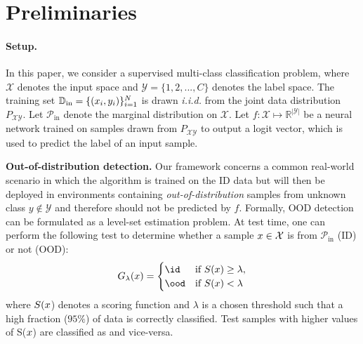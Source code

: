 \section{Preliminaries}
\label{sec:background}
\paragraph{Setup.} In this paper, we consider a supervised multi-class classification problem, where $\mathcal{X}$ denotes the input space and $\mathcal{Y}=\{1,2,...,C\}$ denotes the label space. The training set $\mathbb{D}_\text{in} = \{(\*x_i, y_i)\}_{i=1}^N$ is drawn \emph{i.i.d.} from the joint data distribution $P_{\mathcal{X}\mathcal{Y}}$.
Let $\mathcal{P}_\text{in}$ denote the marginal distribution on $\mathcal{X}$. Let $f: \mathcal{X} \mapsto \mathbb{R}^{|\mathcal{Y}|}$ be a neural network trained on samples drawn from $P_{\mathcal{X}\mathcal{Y}}$ to output a logit vector, which is used to predict the label of an input sample. 

\vspace{0.05cm}
\noindent\textbf{Out-of-distribution detection.} 
Our framework concerns a common real-world scenario in which the algorithm is trained on the ID data but will then be deployed in environments containing \emph{out-of-distribution} samples from {unknown} class $y\notin \mathcal{Y}$ and therefore should not be predicted by $f$. Formally, OOD detection can be formulated as a level-set estimation problem. At test time, one can perform the  following test to determine whether a sample $\*x \in \mathcal{X}$ is from $\mathcal{P}_{\text{in}}$ (ID) or not (OOD):
\begin{equation}
	G_{\lambda}(\*x) =
	\begin{cases}
		\id & \text{if}\ S(\*x) \geq \lambda, \\
		\ood & \text{if}\ S(\*x) < \lambda \\
	\end{cases}
	\label{equ:ood_score}
\end{equation}
where $S(\*x$) denotes a scoring function and $\lambda$ is a chosen threshold such that a high fraction ($95\%$) of \id data is correctly classified. Test samples with higher values of S($\*x$) are classified as \id and vice-versa. 